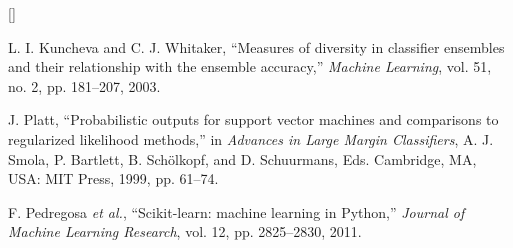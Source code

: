 \documentclass[11pt,a4paper]{article}
\newcounter{refcount}
\begin{document}
\begin{list}{[]}
\item L. I. Kuncheva and C. J. Whitaker, ``Measures of diversity in classifier ensembles and their relationship with the ensemble accuracy,'' \emph{Machine Learning}, vol. 51, no. 2, pp. 181--207, 2003.
\item J. Platt, ``Probabilistic outputs for support vector machines and comparisons to regularized likelihood methods,'' in \emph{Advances in Large Margin Classifiers}, A. J. Smola, P. Bartlett, B. Sch\"olkopf, and D. Schuurmans, Eds. Cambridge, MA, USA: MIT Press, 1999, pp. 61--74.
\item F. Pedregosa \emph{et al.}, ``Scikit-learn: machine learning in Python,'' \emph{Journal of Machine Learning Research}, vol. 12, pp. 2825--2830, 2011.
\end{list}
\end{document}
